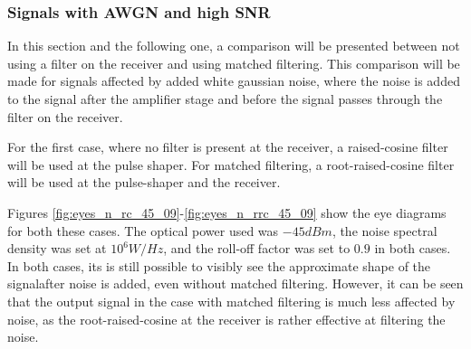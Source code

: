 \subsubsection*{Signals with AWGN and high SNR}

In this section and the following one, a comparison will be presented between
not using a filter on the receiver and using matched filtering. This comparison
will be made for signals affected by added white gaussian noise, where the
noise is added to the signal after the amplifier stage and before the signal
passes through the filter on the receiver.

For the first case, where no filter is present at the receiver, a
raised-cosine filter will be used at the pulse shaper. For matched filtering, a
root-raised-cosine filter will be used at the pulse-shaper and the receiver.

Figures \ref{fig:eyes_n_rc_45_09}-\ref{fig:eyes_n_rrc_45_09} show the eye
diagrams for both these cases. The optical power used was $-45 dBm$, the
noise spectral density was set at $10^6 W/Hz$, and the roll-off factor was set
to $0.9$ in both cases. In both cases, its is still possible to visibly see the
approximate shape of the signalafter noise is added, even without matched
filtering. However, it can be seen that the output signal in the case with
matched filtering is much less affected by noise, as the root-raised-cosine at
the receiver is rather effective at filtering the noise.


